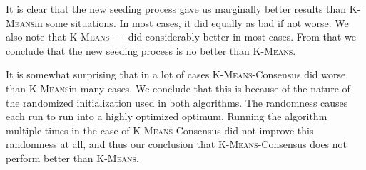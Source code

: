 \documentclass[12pt]{dalthesis}
\newcommand*{\kmeansn}{\textsc{K-Means}} %
\newcommand*{\kmeans}{\kmeansn } %
\begin{document}
\begin{center}
   \label{table:dimred} 
\end{center}


It is clear that the new seeding process gave us marginally better results than \kmeans in some situations. In most cases, it did equally as bad if not worse. We also note that \kmeansn++ did considerably better in most cases. From that we conclude that the new seeding process is no better than \kmeans.

It is somewhat surprising that in a lot of cases \kmeansn-Consensus did worse than \kmeans in many cases. We conclude that this is because of the nature of the randomized initialization used in both algorithms. The randomness causes each run to run into a highly optimized optimum. Running the algorithm multiple times in the case of \kmeansn-Consensus did not improve this randomness at all, and thus our conclusion that \kmeansn-Consensus does not perform better than \kmeans.
\end{document}
